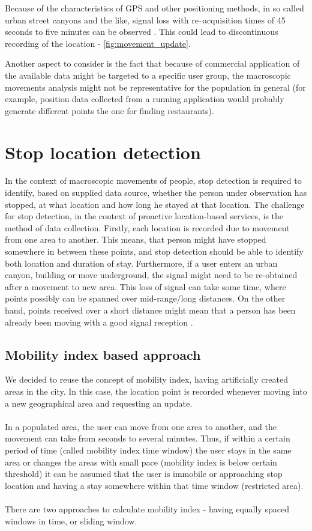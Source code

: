 Because of the characteristics of GPS and other positioning methods, in so called urban street canyons and the like, signal loss with re–acquisition times of 45 seconds to five minutes can be observed \cite{StopDet1}. This could lead to discontinuous recording of the location - \autoref{fig:movement_update}.

Another aspect to consider is the fact that because of commercial application of the available data might be targeted to a specific user group, the macroscopic movements analysis might not be representative for the population in general (for example, position data  collected from a running application would probably generate different points the one for finding restaurants).

\section{Stop location detection}

In the context of macroscopic movements of people, stop detection is required to identify, based on supplied data source, whether the person under observation has stopped, at what location and how long he stayed at that location. The challenge for stop detection, in the context of proactive location-based services, is the method of data collection. Firstly, each location is recorded due to movement from one area to another. This means, that person might have stopped somewhere in between these points, and stop detection should be able to identify both location and duration of stay. Furthermore, if a user enters an urban canyon, building or move underground, the signal might need to be re-obtained after a movement to new area. This loss of signal can take some time, where points possibly can be spanned over mid-range/long distances. On the other hand, points received over a short distance might mean that a person has been already been moving with a good signal reception .

\subsection{Mobility index based approach}
\label{cha:stopdet_mi}

We decided to reuse the concept of mobility index, having artificially created areas in the city. In this case, the location point is recorded whenever moving into a new geographical area and requesting an update.
\\\\
In a populated area, the user can move from one area to another, and the movement can take from seconds to several minutes. Thus, if within a certain
period of time (called mobility index time window) the user stays in the same area or changes the areas with small pace (mobility index is below certain threshold) it can be assumed that the user is immobile or approaching stop location and having a stay somewhere within that time window (restricted area). 
\\\\
There are two approaches to calculate mobility index - having equally spaced windows in time, or sliding window.

